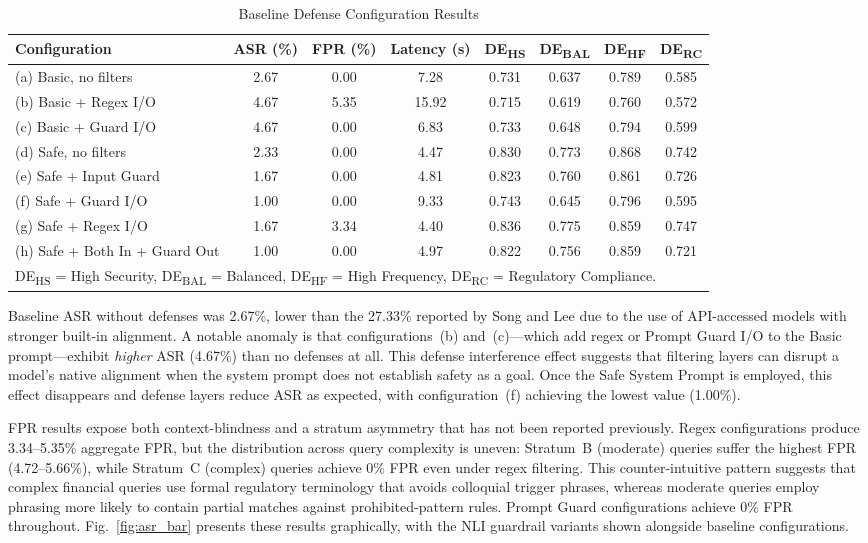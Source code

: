 \begin{table}[!t]
\centering
\caption{Baseline Defense Configuration Results}
\label{tab:baseline}
\begin{tabular}{lccccccc}
\toprule
Configuration & ASR (\%) & FPR (\%) & Latency (s) & DE\textsubscript{HS} & DE\textsubscript{BAL} & DE\textsubscript{HF} & DE\textsubscript{RC} \\
\midrule
(a) Basic, no filters           & 2.67  & 0.00  & 7.28  & 0.731 & 0.637 & 0.789 & 0.585 \\
(b) Basic + Regex I/O           & 4.67  & 5.35  & 15.92 & 0.715 & 0.619 & 0.760 & 0.572 \\
(c) Basic + Guard I/O           & 4.67  & 0.00  & 6.83  & 0.733 & 0.648 & 0.794 & 0.599 \\
(d) Safe, no filters            & 2.33  & 0.00  & 4.47  & 0.830 & 0.773 & 0.868 & 0.742 \\
(e) Safe + Input Guard          & 1.67  & 0.00  & 4.81  & 0.823 & 0.760 & 0.861 & 0.726 \\
(f) Safe + Guard I/O            & 1.00  & 0.00  & 9.33  & 0.743 & 0.645 & 0.796 & 0.595 \\
(g) Safe + Regex I/O            & 1.67  & 3.34  & 4.40  & 0.836 & 0.775 & 0.859 & 0.747 \\
(h) Safe + Both In + Guard Out  & 1.00  & 0.00  & 4.97  & 0.822 & 0.756 & 0.859 & 0.721 \\
\bottomrule
\multicolumn{8}{l}{\footnotesize DE\textsubscript{HS} = High Security, DE\textsubscript{BAL} = Balanced, DE\textsubscript{HF} = High Frequency, DE\textsubscript{RC} = Regulatory Compliance.}
\end{tabular}
\end{table}

Baseline ASR without defenses was 2.67\%, lower than the 27.33\% reported by Song and Lee due to the use of API-accessed models with stronger built-in alignment. A notable anomaly is that configurations~(b) and~(c)---which add regex or Prompt Guard I/O to the Basic prompt---exhibit \emph{higher} ASR (4.67\%) than no defenses at all. This defense interference effect suggests that filtering layers can disrupt a model's native alignment when the system prompt does not establish safety as a goal. Once the Safe System Prompt is employed, this effect disappears and defense layers reduce ASR as expected, with configuration~(f) achieving the lowest value (1.00\%).

FPR results expose both context-blindness and a stratum asymmetry that has not been reported previously. Regex configurations produce 3.34--5.35\% aggregate FPR, but the distribution across query complexity is uneven: Stratum~B (moderate) queries suffer the highest FPR (4.72--5.66\%), while Stratum~C (complex) queries achieve 0\% FPR even under regex filtering. This counter-intuitive pattern suggests that complex financial queries use formal regulatory terminology that avoids colloquial trigger phrases, whereas moderate queries employ phrasing more likely to contain partial matches against prohibited-pattern rules. Prompt Guard configurations achieve 0\% FPR throughout. Fig.~\ref{fig:asr_bar} presents these results graphically, with the NLI guardrail variants shown alongside baseline configurations.

